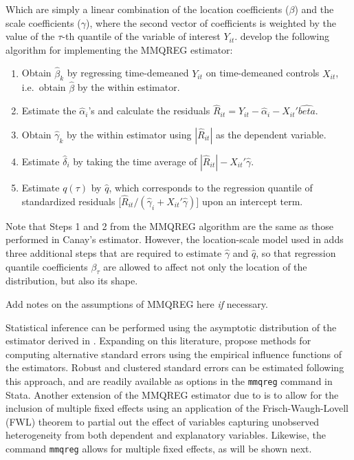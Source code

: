 \documentclass[bib]{statapress}
\begin{document}
Which are simply a linear combination of the location coefficients
(\(\beta\)) and the scale coefficients (\(\gamma\)), where the second
vector of coefficients is weighted by the value of the \(\tau\)-th
quantile of the variable of interest \(Y_{it}\). \citep{mss2019} develop
the following algorithm for implementing the MMQREG estimator:

\begin{enumerate}
\def\labelenumi{\arabic{enumi}.}
\item
  Obtain \(\hat{\beta}_k\) by regressing time-demeaned \(Y_{it}\) on
  time-demeaned controls \(X_{it}\), i.e.~obtain \(\hat{\beta}\) by the
  within estimator.
\item
  Estimate the \(\hat{\alpha}_i\)'s and calculate the residuals
  \(\hat{R}_{it} = Y_{it} - \hat{\alpha}_i - X_{it}' \hat{beta}\).
\item
  Obtain \(\hat{\gamma}_k\) by the within estimator using
  \(|\hat{R}_{it}|\) as the dependent variable.
\item
  Estimate \(\hat{\delta}_i\) by taking the time average of
  \(|\hat{R}_{it}| - X_{it}' \hat{\gamma}\).
\item
  Estimate \(q(\tau)\) by \(\hat{q}\), which corresponds to the
  regression quantile of standardized residuals
  {[}\(\hat{R}_{it}/(\hat{\gamma}_{i} + X_{it}' \hat{\gamma})]\) upon an
  intercept term.
\end{enumerate}

Note that Steps 1 and 2 from the MMQREG algorithm are the same as those
performed in Canay's estimator. However, the location-scale model used
in \citep{mss2019} adds three additional steps that are required to
estimate \(\hat{\gamma}\) and \(\hat{q}\), so that regression quantile
coefficients \(\beta_{\tau}\) are allowed to affect not only the
location of the distribution, but also its shape.

Add notes on the assumptions of MMQREG here \emph{if} necessary.

Statistical inference can be performed using the asymptotic distribution
of the estimator derived in \citep{mss2019}. Expanding on this
literature, \citep{riosavila2024} propose methods for computing
alternative standard errors using the empirical influence functions of
the estimators. Robust and clustered standard errors can be estimated
following this approach, and are readily available as options in the
\texttt{mmqreg} command in Stata. Another extension of the MMQREG
estimator due to \citep{riosavila2024} is to allow for the inclusion of
multiple fixed effects using an application of the Frisch-Waugh-Lovell
(FWL) theorem to partial out the effect of variables capturing
unobserved heterogeneity from both dependent and explanatory variables.
Likewise, the command \texttt{mmqreg} allows for multiple fixed effects,
as will be shown next.
\end{document}
